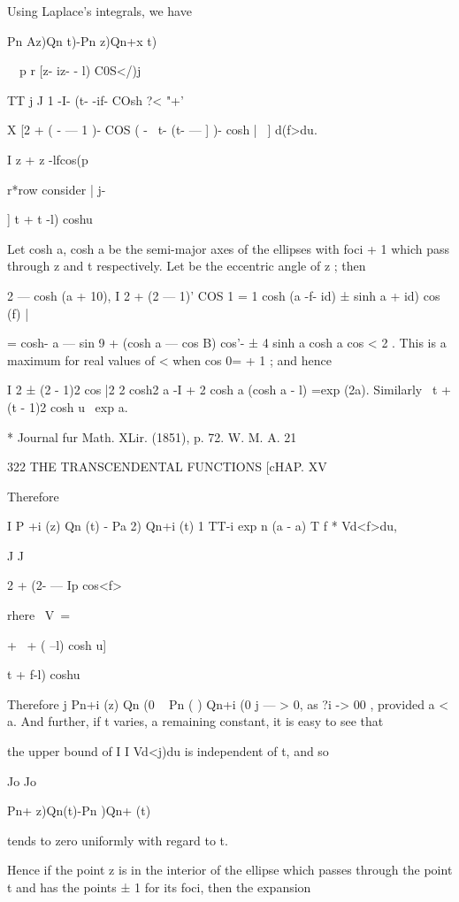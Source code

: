 {{{Using Laplace's integrals, we have 

Pn Az)Qn t)-Pn z)Qn+x t) 

\ \ p r [z- iz- - l) C0S</)j  

TT j J 1  -I- (t- -if- COsh ?< "+' 

X [2 + ( - — 1 )- COS (  - \ t-  (t- — ] )- cosh  |~ ] d(f>du. 

I z +  z -lfcos(p 

r*row consider |   j- 

] t +  t -l) coshu 

Let cosh a, cosh a be the semi-major axes of the ellipses with foci + 1 which pass 
through z and t respectively. Let be the eccentric angle of z ; then 

2 — cosh (a + 10), 
I 2 + (2  — 1)'  COS  1 = 1 cosh (a -f- id) ± sinh  a + id) cos (f) | 

=  cosh- a — sin  9 + (cosh  a — cos  B) cos'-  ± 4 sinh a cosh a cos <  2 . 
This is a maximum for real values of <  when cos 0= + 1 ; and hence 

I 2 ± (2  - 1)2 cos |2   2 cosh2 a -I + 2 cosh a (cosh  a - l) =exp (2a). 
Similarly \ t + (t - 1)2 cosh u \   exp a. 

* Journal fur Math. XLir. (1851), p. 72. 
W. M. A. 21 



322 THE TRANSCENDENTAL FUNCTIONS [cHAP. XV 

Therefore 

I P +i (z) Qn (t) - Pa  2) Qn+i (t) 1   TT-i exp  n (a - a)  T f * Vd<f>du, 

J J 

2 + (2- — Ip cos<f> 



rhere \ V\ = 



+ \    + ( --l) cosh u] 



t +  f-l) coshu 

Therefore j Pn+i (z) Qn (0 ~ Pn ( ) Qn+i (0 j — > 0, as ?i -> 00 , provided a < a. 
And further, if t varies, a remaining constant, it is easy to see that 

the upper bound of I I Vd<j)du is independent of t, and so 

Jo Jo 

Pn+  z)Qn(t)-Pn  )Qn+ (t) 

tends to zero uniformly with regard to t. 

Hence if the point z is in the interior of the ellipse which passes through 
the point t and has the points ± 1 for its foci, then the expansion 

}}}

